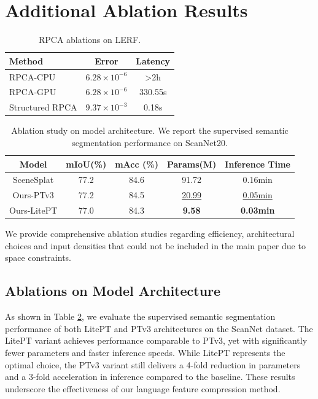 \section{Additional Ablation Results}
\label{sec:ablation_details}
\label{sec:extended-ablation}
\begin{table}[tb]
  \centering
  \caption{RPCA ablations on LERF.}
  \label{tab:ablation_latency}
  \begin{tabular}{@{}l|cc@{}}
    \toprule
    Method & Error & Latency \\
    \midrule
    RPCA-CPU & $6.28 \times 10^{-6}$ & >2h \\
    RPCA-GPU & $6.28 \times 10^{-6}$ & 330.55s \\
    Structured RPCA & $9.37 \times 10^{-3}$ & 0.18s \\
    \bottomrule
  \end{tabular}
\end{table}
\begin{table}[tb]
  \centering
  \caption{Ablation study on model architecture. We report the supervised semantic segmentation performance on ScanNet20.}
  \label{tab:ablation-arch}
  \begin{tabular}{c|cc|cc}
    \toprule
    \textbf{Model} &  mIoU(\%) & mAcc (\%) & Params(M) & Inference Time \\
    \midrule
    SceneSplat & 77.2 & 84.6 & 91.72 & 0.16min \\
    \midrule
    Ours-PTv3 & 77.2 & 84.5 & \underline{20.99} & \underline{0.05min} \\
    Ours-LitePT & 77.0 & 84.3 & \textbf{9.58} & \textbf{0.03min} \\
    \bottomrule
  \end{tabular}
\end{table}

We provide comprehensive ablation studies regarding efficiency, architectural choices and input
densities that could not be included in the main paper due to space constraints.

\subsection{Ablations on Model Architecture}
As shown in Table \ref{tab:ablation-arch}, we evaluate the supervised semantic segmentation performance of both LitePT and PTv3 architectures on the ScanNet dataset. The LitePT variant achieves performance comparable to PTv3, yet with significantly fewer parameters and faster inference speeds. While LitePT represents the optimal choice, the PTv3 variant still delivers a 4-fold reduction in parameters and a 3-fold acceleration in inference compared to the baseline. These results underscore the effectiveness of our language feature compression method.

